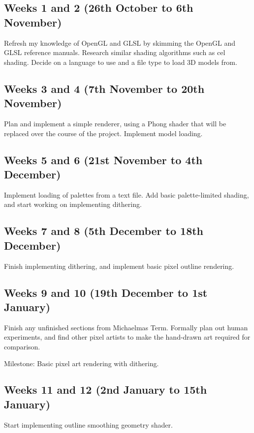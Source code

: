 \documentclass[12pt]{article}
\begin{document}
\subsection*{Weeks 1 and 2 (26th October to 6th November)}

Refresh my knowledge of OpenGL and GLSL by skimming the OpenGL and GLSL reference manuals. Research similar shading algorithms such as cel shading. Decide on a language to use and a file type to load 3D models from.

\subsection*{Weeks 3 and 4 (7th November to 20th November)}

Plan and implement a simple renderer, using a Phong shader that will be replaced over the course of the project. Implement model loading.

\subsection*{Weeks 5 and 6 (21st November to 4th December)}

Implement loading of palettes from a text file. Add basic palette-limited shading, and start working on implementing dithering.

\subsection*{Weeks 7 and 8 (5th December to 18th December)}

Finish implementing dithering, and implement basic pixel outline rendering.

\subsection*{Weeks 9 and 10 (19th December to 1st January)}

Finish any unfinished sections from Michaelmas Term. Formally plan out human experiments, and find other pixel artists to make the hand-drawn art required for comparison.

Milestone: Basic pixel art rendering with dithering.

\subsection*{Weeks 11 and 12 (2nd January to 15th January)}

Start implementing outline smoothing geometry shader.
\end{document}
